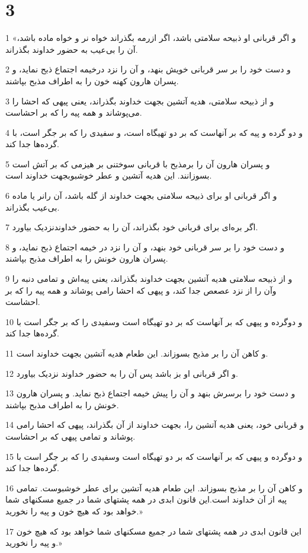 \chapter{3}

\par 1 «و اگر قربانی او ذبیحه سلامتی باشد، اگر ازرمه بگذراند خواه نر و خواه ماده باشد، آن را بی‌عیب به حضور خداوند بگذراند.
\par 2 و دست خود را بر سر قربانی خویش بنهد، و آن را نزد درخیمه اجتماع ذبح نماید، و پسران هارون کهنه خون را به اطراف مذبح بپاشند.
\par 3 و از ذبیحه سلامتی، هدیه آتشین بجهت خداوند بگذراند، یعنی پیهی که احشا را می‌پوشاند و همه پیه را که بر احشاست.
\par 4 و دو گرده و پیه که بر آنهاست که بر دو تهیگاه است، و سفیدی را که بر جگر است، با گرده‌ها جدا کند.
\par 5 و پسران هارون آن را برمذبح با قربانی سوختنی بر هیزمی که بر آتش است بسوزانند. این هدیه آتشین و عطر خوشبوبجهت خداوند است.
\par 6 و اگر قربانی او برای ذبیحه سلامتی بجهت خداوند از گله باشد، آن رانر یا ماده بی‌عیب بگذراند.
\par 7 اگر بره‌ای برای قربانی خود بگذراند، آن را به حضور خداوندنزدیک بیاورد.
\par 8 و دست خود را بر سر قربانی خود بنهد، و آن را نزد در خیمه اجتماع ذبح نماید، و پسران هارون خونش را به اطراف مذبح بپاشند.
\par 9 و از ذبیحه سلامتی هدیه آتشین بجهت خداوند بگذراند، یعنی پیه‌اش و تمامی دنبه را وآن را از نزد عصعص جدا کند، و پیهی که احشا رامی پوشاند و همه پیه را که بر احشاست.
\par 10 و دوگرده و پیهی که بر آنهاست که بر دو تهیگاه است وسفیدی را که بر جگر است با گرده‌ها جدا کند.
\par 11 و کاهن آن را بر مذبح بسوزاند. این طعام هدیه آتشین بجهت خداوند است.
\par 12 و اگر قربانی او بز باشد پس آن را به حضور خداوند نزدیک بیاورد.
\par 13 و دست خود را برسرش بنهد و آن را پیش خیمه اجتماع ذبح نماید. و پسران هارون خونش را به اطراف مذبح بپاشند.
\par 14 و قربانی خود، یعنی هدیه آتشین را، بجهت خداوند از آن بگذراند، پیهی که احشا رامی پوشاند و تمامی پیهی که بر احشاست.
\par 15 و دوگرده و پیهی که بر آنهاست که بر دو تهیگاه است وسفیدی را که بر جگر است با گرده‌ها جدا کند.
\par 16 و کاهن آن را بر مذبح بسوزاند. این طعام هدیه آتشین برای عطر خوشبوست. تمامی پیه از آن خداوند است.این قانون ابدی در همه پشتهای شما در جمیع مسکنهای شما خواهد بود که هیچ خون و پیه را نخورید.»
\par 17 این قانون ابدی در همه پشتهای شما در جمیع مسکنهای شما خواهد بود که هیچ خون و پیه را نخورید.»
 

